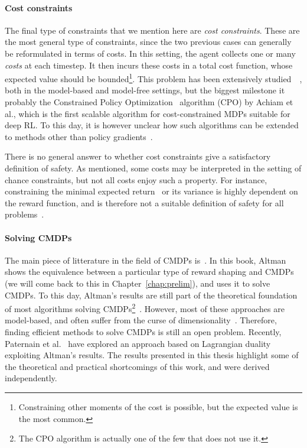 		\paragraph{Cost constraints} The final type of constraints that we mention here are\emph{ cost constraints}. These are the most general type of constraints, since the two previous cases can generally be reformulated in terms of costs. In this setting, the agent collects one or many\emph{ costs} at each timestep. It then incurs these costs in a total cost function, whose expected value should be bounded\footnote{Constraining other moments of the cost is possible, but the expected value is the most common.}. This problem has been extensively studied~\cite{garcia2015comprehensive}~\cite{kim2012cost}, both in the model-based and model-free settings, but the biggest milestone it probably the Constrained Policy Optimization~\cite{achiam2017constrained} algorithm (CPO) by Achiam et al., which is the first scalable algorithm for cost-constrained MDPs suitable for deep RL. To this day, it is however unclear how such algorithms can be extended to methods other than policy gradients~\cite{chow2018lyapunov}. \par
		There is no general answer to whether cost constraints give a satisfactory definition of safety. As mentioned, some costs may be interpreted in the setting of chance constraints, but not all costs enjoy such a property. For instance, constraining the minimal expected return~\cite{hans2008safe} or its variance is highly dependent on the reward function, and is therefore not a suitable definition of safety for all problems~\cite{garcia2015comprehensive}.
		\paragraph{Solving CMDPs} The main piece of litterature in the field of CMDPs is~\cite{altman1999constrained}. In this book, Altman shows the equivalence between a particular type of reward shaping and CMDPs (we will come back to this in Chapter~\ref{chap:prelim}), and uses it to solve CMDPs. To this day, Altman's results are still part of the theoretical foundation of most algorithms solving CMDPs\footnote{The CPO algorithm is actually one of the few that does not use it.}~\cite{zheng2020constrained}. However, most of these approaches are model-based, and often suffer from the curse of dimensionality~\cite{kim2012cost}. Therefore, finding efficient methods to solve CMDPs is still an open problem. Recently, Paternain et al.~\cite{paternain2019safe} have explored an approach based on Lagrangian duality exploiting Altman's results. The results presented in this thesis highlight some of the theoretical and practical shortcomings of this work, and were derived independently.
		

